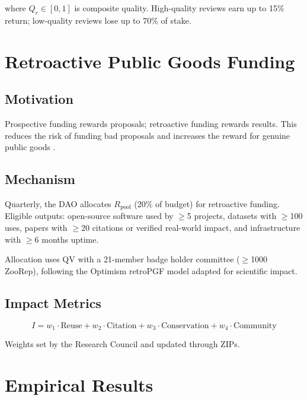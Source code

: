 \documentclass[11pt,a4paper]{article}
\begin{document}
where $Q_r \in [0,1]$ is composite quality. High-quality reviews earn
up to 15\% return; low-quality reviews lose up to 70\% of stake.


\section{Retroactive Public Goods Funding}
\label{sec:retro}

\subsection{Motivation}

Prospective funding rewards proposals; retroactive funding rewards
results. This reduces the risk of funding bad proposals and increases
the reward for genuine public goods \citep{boudreau2016looking}.

\subsection{Mechanism}

Quarterly, the DAO allocates $R_{\text{pool}}$ (20\% of budget) for
retroactive funding. Eligible outputs: open-source software used by
$\geq$5 projects, datasets with $\geq$100 uses, papers with $\geq$20
citations or verified real-world impact, and infrastructure with
$\geq$6 months uptime.

Allocation uses QV with a 21-member badge holder committee ($\geq$1000
ZooRep), following the Optimism retroPGF model
\citep{optimism2023retropgf} adapted for scientific impact.

\subsection{Impact Metrics}

\begin{equation}
  I = w_1 \cdot \text{Reuse} + w_2 \cdot \text{Citation} +
  w_3 \cdot \text{Conservation} + w_4 \cdot \text{Community}
\end{equation}

Weights set by the Research Council and updated through ZIPs.


\section{Empirical Results}
\label{sec:results}
\end{document}
